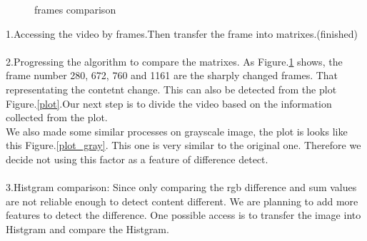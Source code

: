 \documentclass[11pt]{article} %
\begin{document}
    \begin{figure}
    \centering

    \caption{frames comparison}
    \label{picture}
    \end{figure}
1.Accessing the video by frames.Then transfer the frame into matrixes.(finished)\\\\
2.Progressing the algorithm to compare the matrixes. As Figure.\ref{picture} shows, the frame number 280, 672, 760 and 1161 are the sharply changed frames. That representating the contetnt change. This can also be detected from the plot Figure.\ref{plot}.Our next step is to divide the video based on the information
collected from the plot.\\We also made some similar processes on grayscale image, the plot is looks like this Figure.\ref {plot_gray}. This one is very similar to the original one. Therefore we decide not using this factor as a feature of difference detect.\\\\
3.Histgram comparison: Since only comparing the rgb difference and sum values are not reliable enough to detect content different. We are planning to add more features to detect the difference. One possible access is to transfer the image into Histgram and compare the Histgram.\\\\
\end{document}
